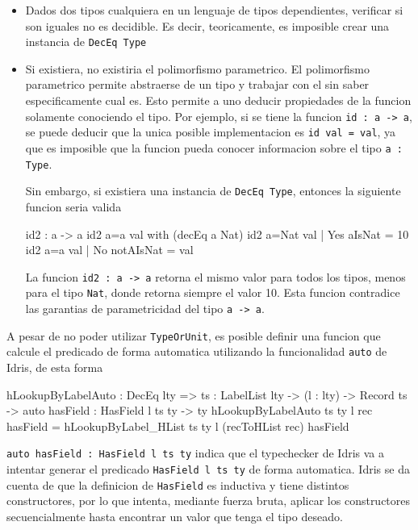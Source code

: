 \begin{itemize}
\item Dados dos tipos cualquiera en un lenguaje de tipos dependientes, verificar si son iguales no es decidible. Es decir, teoricamente, es imposible crear una instancia de \texttt{DecEq Type}
\item Si existiera, no existiria el polimorfismo parametrico. El polimorfismo parametrico permite abstraerse de un tipo y trabajar con el sin saber especificamente cual es. Esto permite a uno deducir propiedades de la funcion solamente conociendo el tipo. Por ejemplo, si se tiene la funcion \texttt{id : a -> a}, se puede deducir que la unica posible implementacion es \texttt{id val = val}, ya que es imposible que la funcion pueda conocer informacion sobre el tipo \texttt{a : Type}.

Sin embargo, si existiera una instancia de \texttt{DecEq Type}, entonces la siguiente funcion seria valida

\begin{code}
id2 : a -> a
id2 {a=a} val with (decEq a Nat)
  id2 {a=Nat} val | Yes aIsNat = 10
  id2 {a=a} val | No notAIsNat = val
\end{code}

La funcion \texttt{id2 : a -> a} retorna el mismo valor para todos los tipos, menos para el tipo \texttt{Nat}, donde retorna siempre el valor 10. Esta funcion contradice las garantias de parametricidad del tipo \texttt{a -> a}.

\end{itemize}

A pesar de no poder utilizar \texttt{TypeOrUnit}, es posible definir una funcion que calcule el predicado de forma automatica utilizando la funcionalidad \texttt{auto} de Idris, de esta forma

\begin{code}
hLookupByLabelAuto : DecEq lty => {ts : LabelList lty} -> 
  (l : lty) -> Record ts -> 
  {auto hasField : HasField l ts ty} -> ty
hLookupByLabelAuto {ts} {ty} l rec {hasField} = 
  hLookupByLabel_HList {ts} {ty} l (recToHList rec) hasField
\end{code}

\texttt{auto hasField : HasField l ts ty} indica que el typechecker de Idris va a intentar generar el predicado \texttt{HasField l ts ty} de forma automatica. Idris se da cuenta de que la definicion de \texttt{HasField} es inductiva y tiene distintos constructores, por lo que intenta, mediante fuerza bruta, aplicar los constructores secuencialmente hasta encontrar un valor que tenga el tipo deseado.

